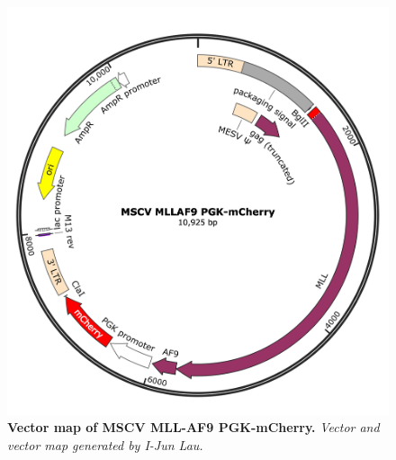 \begin{figure}[p]
    \centering
    \includegraphics[width=\textwidth,height=\textheight,keepaspectratio]{figures/appendix/app_plasmid-map.png}
    \caption[{Vector map of MSCV MLL-AF9 PGK-mCherry.}]
    {\textbf{Vector map of MSCV MLL-AF9 PGK-mCherry.} 
    \textit{Vector and vector map generated by I-Jun Lau.}
    }
    \label{fig:app_plasmid-map}
\end{figure}
\clearpage

